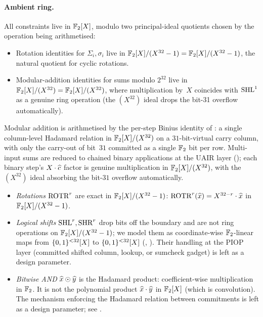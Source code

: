 \paragraph{Ambient ring.}
All constraints live in $\mathbb{F}_2[X]$, modulo two principal-ideal
quotients chosen by the operation being arithmetised:
\begin{itemize}[leftmargin=2em,topsep=2pt]
  \item Rotation identities for $\Sigma_i, \sigma_i$ live in
        $\mathbb{F}_2[X]/(X^{32}-1) = \mathbb{F}_2[X]/(X^{32}-1)$, the natural quotient for cyclic
        rotations.
  \item Modular-addition identities for sums modulo $2^{32}$ live in
        $\mathbb{F}_2[X]/(X^{32}) = \mathbb{F}_2[X]/(X^{32})$, where multiplication by~$X$
        coincides with $\operatorname{SHL}^{1}$ as a genuine ring operation (the
        $(X^{32})$ ideal drops the bit-31 overflow automatically).
\end{itemize}
Modular addition is arithmetised by the per-step Binius identity of
: a single column-level Hadamard relation in
$\mathbb{F}_2[X]/(X^{32})$ on a $31$-bit-virtual carry column, with only the carry-out
of bit~$31$ committed as a single $\mathbb{F}_2$ bit per row. Multi-input
sums are reduced to chained binary applications at the UAIR layer
(); each binary step's $X\cdot\widehat{c}$ factor
is genuine multiplication in $\mathbb{F}_2[X]/(X^{32})$, with the $(X^{32})$ ideal
absorbing the bit-$31$ overflow automatically.
\begin{itemize}[leftmargin=2em]
  \item \emph{Rotations} $\operatorname{ROTR}^r$ are exact in $\mathbb{F}_2[X]/(X^{32}-1)$:
        $\operatorname{ROTR}^r(\widehat{x}) = X^{32-r}\cdot \widehat{x}$ in $\mathbb{F}_2[X]/(X^{32}-1)$.
  \item \emph{Logical shifts} $\operatorname{SHL}^r, \operatorname{SHR}^r$ drop bits off the
        boundary and are not ring operations on $\mathbb{F}_2[X]/(X^{32}-1)$; we model
        them as coordinate-wise $\mathbb{F}_2$-linear maps from $\{0,1\}^{<32}[X]$
        to $\{0,1\}^{<32}[X]$ (,
        ). Their handling at the PIOP layer
        (committed shifted column, lookup, or sumcheck gadget) is
        left as a design parameter.
  \item \emph{Bitwise AND} $\widehat{x} \odot \widehat{y}$ is the Hadamard product:
        coefficient-wise multiplication in $\mathbb{F}_2$. It is not the
        polynomial product $\widehat{x}\cdot\widehat{y}$ in $\mathbb{F}_2[X]$ (which is
        convolution). The mechanism enforcing the Hadamard relation
        between commitments is left as a design parameter; see
        .
\end{itemize}

